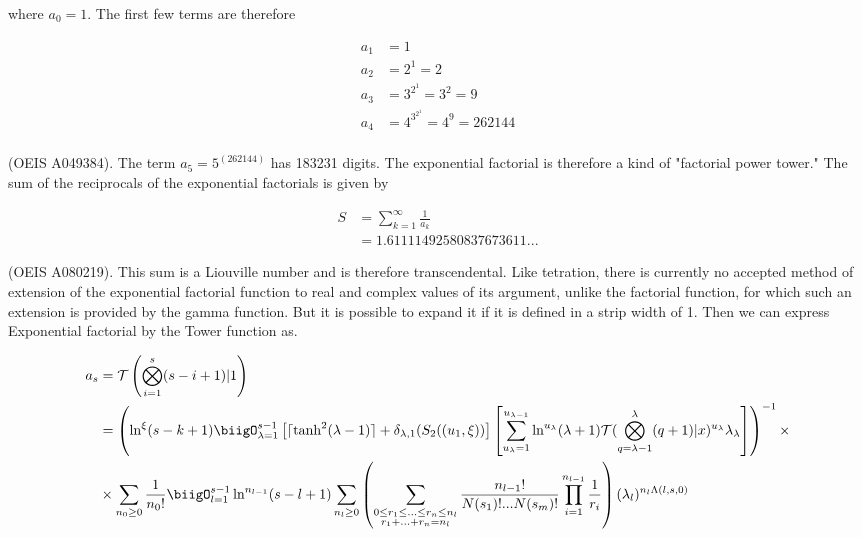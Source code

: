 where \(a_0=1\). The first few terms are therefore

\begin{align}
        a_1	&=	1	 \\
        a_2	&=	2^1=2	\\
        a_3	&=	3^{2^1}=3^2=9	\\
        a_4	&=	4^{3^{2^1}}=4^9=262144	\\
\end{align}

(OEIS A049384). The term \(a_5=5^(262144)\) has 183231 digits. The exponential 
factorial is therefore a kind of "factorial power tower." The sum of the reciprocals 
of the exponential factorials is given by

\begin{align}
        S	&=	\sum_{k=1}^{\infty}\frac{1}{a_k}	\\
        &=	1.61111492580837673611...
\end{align}

(OEIS A080219). This sum is a Liouville number and is therefore transcendental.
Like tetration, there is currently no accepted method of extension of the exponential
factorial function to real and complex values of its argument, unlike the factorial 
function, for which such an extension is provided by the gamma function. But it is 
possible to expand it if it is defined in a strip width of 1. Then we can express 
Exponential factorial by the Tower function as.

\begin{align}
        a_s &= \mathcal{T}\left(\bigotimes_{i=1}^s(s-i+1)|1\right) \\
        & = \left(\ln^\xi (s-k+1) \biigO_{\lambda = 1}^{s-1} \left[ \lceil 
        \tanh^2(\lambda -1)\rceil+\delta_{\lambda, 1}(S_2((u_1, \xi))\right]
        \left[\sum_{u_{\lambda}=1}^{u_{\lambda-1}}\ln^{u_{\lambda}}(\lambda+1) 
        \mathcal{T}(\bigotimes_{q = \lambda-1}^\lambda (q+1) |x)^{u_{\lambda}}
        \lambda_\lambda \right]\right)^{-1}\times \\ &\times \sum_{n_0\geq 0}
        \frac{1}{n_0!}\biigO_{l=1}^{s-1} \ln^{n_{l-1}}(s-l+1)
        \sum_{n_l\geq0} \left(\sum_{\substack{0\leq r_1 \leq...\leq r_n\leq n_l 
        \\ r_1 +...+r_n = n_l}}\frac{n_{l-1}!}{N(s_1)!...N(s_m)!}\prod_{i=1}^{n_{l-1}}
        \frac{1}{r_i}\right)(\lambda_l)^{n_l \Lambda \left(l, s,0\right)}
\end{align}
